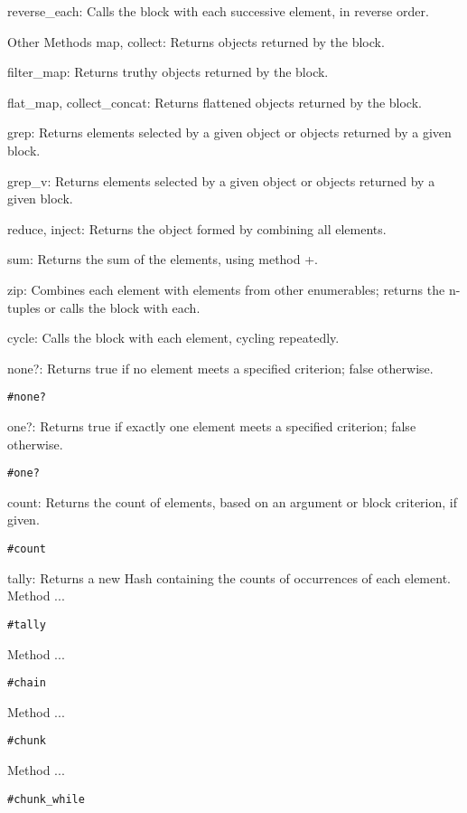 reverse\_each: Calls the block with each successive element, in reverse order.

Other Methods
map, collect: Returns objects returned by the block.

filter\_map: Returns truthy objects returned by the block.

flat\_map, collect\_concat: Returns flattened objects returned by the block.

grep: Returns elements selected by a given object or objects returned by a given block.

grep\_v: Returns elements selected by a given object or objects returned by a given block.

reduce, inject: Returns the object formed by combining all elements.

sum: Returns the sum of the elements, using method +.

zip: Combines each element with elements from other enumerables; returns the n-tuples or calls the block with each.

cycle: Calls the block with each element, cycling repeatedly.


none?: Returns true if no element meets a specified criterion; false otherwise.
\begin{verbatim}
#none?
\end{verbatim}

one?: Returns true if exactly one element meets a specified criterion; false otherwise.
\begin{verbatim}
#one?
\end{verbatim}

count: Returns the count of elements, based on an argument or block criterion, if given.
\begin{verbatim}
#count
\end{verbatim}

tally: Returns a new Hash containing the counts of occurrences of each element.
Method ...
\begin{verbatim}
#tally
\end{verbatim}

Method ...
\begin{verbatim}
#chain
\end{verbatim}

Method ...
\begin{verbatim}
#chunk
\end{verbatim}

Method ...
\begin{verbatim}
#chunk_while
\end{verbatim}


